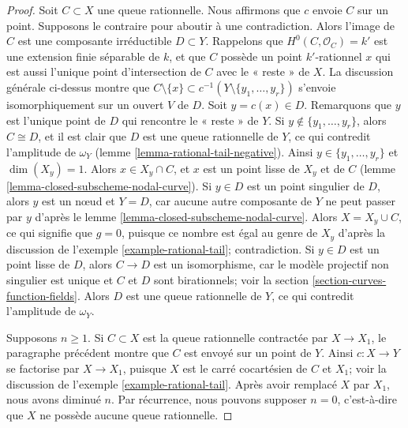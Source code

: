 \begin{proof}
\medskip\noindent
Soit $C \subset X$ une queue rationnelle. Nous affirmons que $c$ envoie $C$ sur un point. Supposons le contraire pour aboutir à une contradiction. Alors l'image de $C$ est une composante irréductible $D \subset Y$. Rappelons que $H^0(C, \mathcal{O}_C) = k'$ est une extension finie séparable de $k$, et que $C$ possède un point $k'$-rationnel $x$ qui est aussi l'unique point d'intersection de $C$ avec le « reste » de $X$. La discussion générale ci-dessus montre que $C \setminus \{x\} \subset c^{-1}(Y \setminus \{y_1, \ldots, y_r\})$ s'envoie isomorphiquement sur un ouvert $V$ de $D$. Soit $y = c(x) \in D$. Remarquons que $y$ est l'unique point de $D$ qui rencontre le « reste » de $Y$. Si $y \not \in \{y_1, \ldots, y_r\}$, alors $C \cong D$, et il est clair que $D$ est une queue rationnelle de $Y$, ce qui contredit l'amplitude de $\omega_Y$ (lemme \ref{lemma-rational-tail-negative}). Ainsi $y \in \{y_1, \ldots, y_r\}$ et $\dim(X_y) = 1$. Alors $x \in X_y \cap C$, et $x$ est un point lisse de $X_y$ et de $C$ (lemme \ref{lemma-closed-subscheme-nodal-curve}). Si $y \in D$ est un point singulier de $D$, alors $y$ est un nœud et $Y = D$, car aucune autre composante de $Y$ ne peut passer par $y$ d'après le lemme \ref{lemma-closed-subscheme-nodal-curve}. Alors $X = X_y \cup C$, ce qui signifie que $g = 0$, puisque ce nombre est égal au genre de $X_y$ d'après la discussion de l'exemple \ref{example-rational-tail}; contradiction. Si $y \in D$ est un point lisse de $D$, alors $C \to D$ est un isomorphisme, car le modèle projectif non singulier est unique et $C$ et $D$ sont birationnels; voir la section \ref{section-curves-function-fields}. Alors $D$ est une queue rationnelle de $Y$, ce qui contredit l'amplitude de $\omega_Y$.

\medskip\noindent
Supposons $n \geq 1$. Si $C \subset X$ est la queue rationnelle contractée par $X \to X_1$, le paragraphe précédent montre que $C$ est envoyé sur un point de $Y$. Ainsi $c : X \to Y$ se factorise par $X \to X_1$, puisque $X$ est le carré cocartésien de $C$ et $X_1$; voir la discussion de l'exemple \ref{example-rational-tail}. Après avoir remplacé $X$ par $X_1$, nous avons diminué $n$. Par récurrence, nous pouvons supposer $n = 0$, c'est-à-dire que $X$ ne possède aucune queue rationnelle.


\end{proof}
